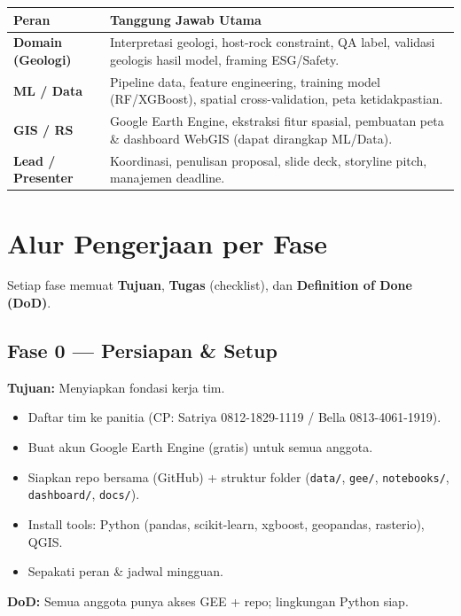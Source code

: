 \documentclass[11pt,a4paper]{article}
\newcommand{\todo}{\item[$\square$]}
\begin{document}
\begin{longtable}{p{3.2cm} p{11.5cm}}
\toprule
\rowcolor{softgray}
\textbf{Peran} & \textbf{Tanggung Jawab Utama} \\
\midrule
\endhead
\textbf{Domain (Geologi)} & Interpretasi geologi, host-rock constraint, QA label,
validasi geologis hasil model, framing ESG/Safety. \\
\textbf{ML / Data} & Pipeline data, feature engineering, training model
(RF/XGBoost), spatial cross-validation, peta ketidakpastian. \\
\textbf{GIS / RS} & Google Earth Engine, ekstraksi fitur spasial, pembuatan
peta \& dashboard WebGIS (dapat dirangkap ML/Data). \\
\textbf{Lead / Presenter} & Koordinasi, penulisan proposal, slide deck,
storyline pitch, manajemen deadline. \\
\bottomrule
\end{longtable}

\section{Alur Pengerjaan per Fase}
\label{sec:phases}

Setiap fase memuat \textbf{Tujuan}, \textbf{Tugas} (checklist),
dan \textbf{Definition of Done (DoD)}.

\subsection{Fase 0 --- Persiapan \& Setup}
\textbf{Tujuan:} Menyiapkan fondasi kerja tim.
\begin{itemize}[leftmargin=1.5em]
  \todo Daftar tim ke panitia (CP: Satriya 0812-1829-1119 / Bella 0813-4061-1919).
  \todo Buat akun Google Earth Engine (gratis) untuk semua anggota.
  \todo Siapkan repo bersama (GitHub) + struktur folder (\texttt{data/}, \texttt{gee/}, \texttt{notebooks/}, \texttt{dashboard/}, \texttt{docs/}).
  \todo Install tools: Python (pandas, scikit-learn, xgboost, geopandas, rasterio), QGIS.
  \todo Sepakati peran \& jadwal mingguan.
\end{itemize}
\textbf{DoD:} Semua anggota punya akses GEE + repo; lingkungan Python siap.

\end{document}
